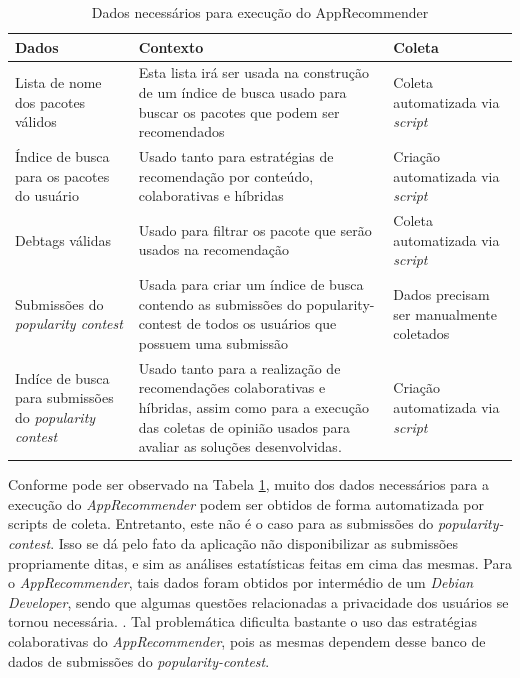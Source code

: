   \begin{table}[h]
  \centering
  \caption{Dados necessários para execução do AppRecommender}
  \label{tab:dados_apprecommender}
  \begin{tabularx}{\textwidth}{|X|X|X|}
  \hline
  \rowcolor[HTML]{EFEFEF}
  {\textbf{Dados}} & {\textbf{Contexto}} & {\textbf{Coleta}} \\ \hline
  Lista de nome dos pacotes válidos &
  Esta lista irá ser usada na construção de um índice de busca
  usado para buscar os pacotes que podem ser recomendados &
  Coleta automatizada via \textit{script} \\
  \hline
  Índice de busca para os pacotes do usuário &
  Usado tanto para estratégias de recomendação por conteúdo,
  colaborativas e híbridas &
  Criação automatizada via \textit{script} \\
  \hline
  Debtags válidas &
  Usado para filtrar os pacote que serão usados na
  recomendação &
  Coleta automatizada via \textit{script} \\
  \hline
  Submissões do \textit{popularity contest} &
  Usada para criar um índice de busca contendo as submissões do
  popularity-contest de todos os usuários que possuem uma submissão &
  Dados precisam ser manualmente coletados \\
  \hline
  Indíce de busca para submissões do \textit{popularity contest} &
  Usado tanto para a realização de recomendações colaborativas e
  híbridas, assim como para a execução das coletas de opinião usados
  para avaliar as soluções desenvolvidas. &
  Criação automatizada via \textit{script} \\
  \hline
  \end{tabularx}
  \end{table}

  Conforme pode ser observado na Tabela \ref{tab:dados_apprecommender}, muito dos dados
  necessários para a execução do \textit{AppRecommender} podem ser obtidos de forma automatizada
  por scripts de coleta. Entretanto, este não é o caso para as submissões do
  \textit{popularity-contest}. Isso se dá pelo fato da aplicação não disponibilizar as submissões
propriamente ditas, e sim as análises estatísticas feitas em cima das mesmas. Para o
\textit{AppRecommender}, tais dados foram obtidos por intermédio de um
\textit{Debian Developer}, sendo que algumas questões relacionadas a privacidade dos usuários se tornou necessária.
\cite{araujo2011apprecommender}. Tal problemática dificulta bastante o uso das
estratégias colaborativas do \textit{AppRecommender}, pois as mesmas dependem desse banco de dados
de submissões do \textit{popularity-contest}.

